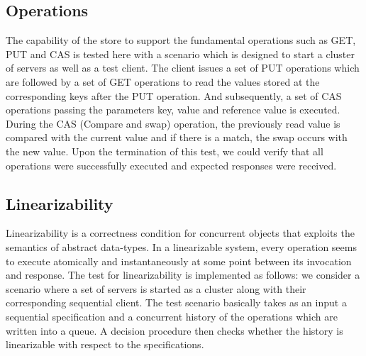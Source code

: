 \documentclass[12pt]{article}
\begin{document}
\subsection{Operations}
The capability of the store to support the fundamental operations such as GET, PUT and CAS is tested here with a scenario which is designed to start a cluster of servers as well as a test client. The client issues a set of PUT operations which are followed by a set of GET operations to read the values stored at the corresponding keys after the PUT operation. And subsequently, a set of CAS operations passing the parameters key, value and reference value is executed. During the CAS (Compare and swap) operation, the previously read value is compared with the current value and if there is a match, the swap occurs with the new value. Upon the termination of this test, we could verify that all operations were successfully executed and expected responses were received.

\subsection{Linearizability}
Linearizability is a correctness condition for concurrent objects that exploits the semantics of abstract data-types. In a linearizable system, every operation seems to execute atomically and instantaneously at some point between its invocation and response. The test for linearizability is implemented as follows: we consider a scenario where a set of servers is started as a cluster along with their corresponding sequential client. The test scenario basically takes as an input a sequential specification and a concurrent history of the operations which are written into a queue. A decision procedure then checks whether the history is linearizable with respect to the specifications. 
\end{document}
